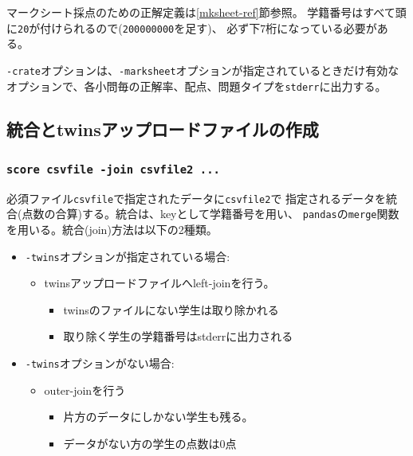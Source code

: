 マークシート採点のための正解定義は\ref{mksheet-ref}節参照。
学籍番号はすべて頭に\texttt{20}が付けられるので(\texttt{200000000}を足す)、
必ず下7桁になっている必要がある。

\texttt{-crate}オプションは、\texttt{-marksheet}オプションが指定されているときだけ有効な
オプションで、各小問毎の正解率、配点、問題タイプを\texttt{stderr}に出力する。

\subsection{統合とtwinsアップロードファイルの作成}
\label{統合とtwinsアップロードファイルの作成}

\subsubsection{\texttt{score csvfile -join csvfile2 ...}}
\label{scorecsvfile-joincsvfile2...}

必須ファイル\texttt{csvfile}で指定されたデータに\texttt{csvfile2}で
指定されるデータを統合(点数の合算)する。統合は、keyとして学籍番号を用い、
\texttt{pandas}の\texttt{merge}関数を用いる。統合(join)方法は以下の2種類。

\begin{itemize}
\item \texttt{-twins}オプションが指定されている場合:

\begin{itemize}
\item twinsアップロードファイルへleft-joinを行う。

\begin{itemize}
\item twinsのファイルにない学生は取り除かれる

\item 取り除く学生の学籍番号はstderrに出力される

\end{itemize}

\end{itemize}

\item \texttt{-twins}オプションがない場合:

\begin{itemize}
\item outer-joinを行う

\begin{itemize}
\item 片方のデータにしかない学生も残る。

\item データがない方の学生の点数は0点

\end{itemize}

\end{itemize}

\end{itemize}

